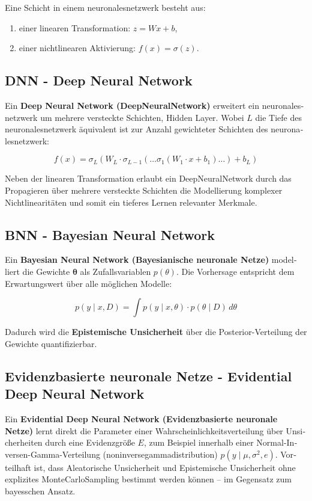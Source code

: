 \begin{otherlanguage}{ngerman}
Eine Schicht in einem \gls{neuronalesnetzwerk} besteht aus:
\begin{enumerate}
  \item einer linearen Transformation: \( z = Wx + b \),
  \item einer nichtlinearen Aktivierung: \( f(x) = \sigma(z) \).
\end{enumerate}


\subsection*{DNN - Deep Neural Network}

Ein \textbf{Deep Neural Network (\gls{DeepNeuralNetwork})} erweitert ein \gls{neuronalesnetzwerk} um mehrere versteckte Schichten, Hidden Layer. Wobei $L$ die Tiefe des \gls{neuronalesnetzwerk} äquivalent ist zur Anzahl gewichteter Schichten des \gls{neuronalesnetzwerk}:

\[
f(x) = \sigma_L\left(W_L \cdot \sigma_{L-1}\left(\ldots \sigma_1\left(W_1 \cdot x + b_1\right) \ldots \right) + b_L\right)
\]

Neben der linearen Transformation erlaubt ein \gls{DeepNeuralNetwork} durch das Propagieren über mehrere versteckte Schichten die Modellierung komplexer Nichtlinearitäten und somit ein tieferes Lernen relevanter Merkmale.

\subsection*{BNN - Bayesian Neural Network}

Ein \textbf{Bayesian Neural Network (\gls{Bayesianische neuronale Netze})} modelliert die Gewichte $\boldsymbol{\theta}$ als Zufallsvariablen $p(\theta)$. Die Vorhersage entspricht dem Erwartungswert über alle möglichen Modelle:

\[
p(y \mid x, D) = \int p(y \mid x, \theta) \cdot p(\theta \mid D) \, d\theta
\]

Dadurch wird die \textbf{\gls{Epistemische Unsicherheit}} über die Posterior-Verteilung der Gewichte quantifizierbar.

\subsection*{\gls{Evidenzbasierte neuronale Netze} - Evidential Deep Neural Network}

Ein \textbf{Evidential Deep Neural Network (\gls{Evidenzbasierte neuronale Netze})} lernt direkt die Parameter einer Wahrscheinlichkeitsverteilung über Unsicherheiten durch eine Evidenzgröße $E$, zum Beispiel innerhalb einer Normal-Inversen-Gamma-Verteilung (\gls{noninversegammadistribution}) $p(y \mid \mu, \sigma^2, e)$. Vorteilhaft ist, dass \gls{Aleatorische Unsicherheit} und \gls{Epistemische Unsicherheit} ohne explizites \gls{MonteCarloSampling} bestimmt werden können – im Gegensatz zum bayesschen Ansatz.


\end{otherlanguage}
